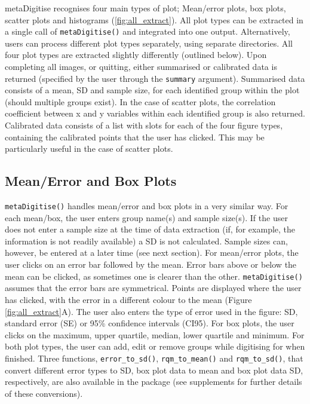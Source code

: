 \documentclass[12pt]{article}
\newcommand{\code}[1]{\texttt{#1}}
\newcommand{\fct}[1]{\texttt{#1()}}
\newcommand{\pkg}[1]{{\fontseries{b}\selectfont #1}}
\begin{document}
\pkg{metaDigitise} recognises four main types of plot; Mean/error plots, box plots, scatter plots and histograms (\ref{fig:all_extract}). All plot types can be extracted in a single call of \fct{metaDigitise} and integrated into one output. Alternatively, users can process different plot types separately, using separate directories. All four plot types are extracted slightly differently (outlined below). Upon completing all images, or quitting, either summarised or calibrated data is returned (specified by the user through the \code{summary} argument). Summarised data consists of a mean, SD and sample size, for each identified group within the plot (should multiple groups exist). In the case of scatter plots, the correlation coefficient between x and y variables within each identified group is also returned. Calibrated data consists of a list with slots for each of the four figure types, containing the calibrated points that the user has clicked. This may be particularly useful in the case of scatter plots. 

\subsection{Mean/Error and Box Plots} 
\fct{metaDigitise} handles mean/error and box plots in a very similar way. For each mean/box, the user enters group name(s) and sample size(s). If the user does not enter a sample size at the time of data extraction (if, for example, the information is not readily available) a SD is not calculated. Sample sizes can, however, be entered at a later time (see next section). For mean/error plots, the user clicks on an error bar followed by the mean. Error bars above or below the mean can be clicked, as sometimes one is clearer than the other. \fct{metaDigitise} assumes that the error bars are symmetrical. Points are displayed where the user has clicked, with the error in a different colour to the mean (Figure \ref{fig:all_extract}A). The user also enters the type of error used in the figure: SD, standard error (SE) or 95\% confidence intervals (CI95). For box plots, the user clicks on the maximum, upper quartile, median, lower quartile and minimum. For both plot types, the user can add, edit or remove groups while digitising for when finished. Three functions, \fct{error\_to\_sd}, \fct{rqm\_to\_mean} and \fct{rqm\_to\_sd}, that convert different error types to SD, box plot data to mean and box plot data SD, respectively, are also available in the package (see supplements for further details of these conversions).
\end{document}
